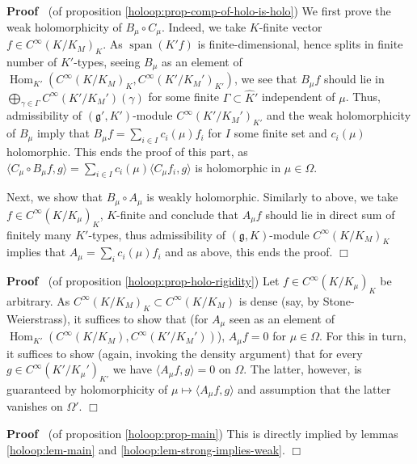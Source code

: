 \documentclass{article}
\newcommand{\tmop}[1]{\ensuremath{\operatorname{#1}}}
\newenvironment{proof}{\noindent\textbf{Proof\ }}{\hspace*{\fill}$\Box$\medskip}
\begin{document}
\begin{proof}
  (of proposition \ref{holoop:prop-comp-of-holo-is-holo}) We first prove the
  weak holomorphicity of $B_{\mu} \circ C_{\mu}$. Indeed, we take $K$-finite
  vector $f \in C^{\infty} (K / K_M)_K$. As $\tmop{span} (K' f)$ is
  finite-dimensional, hence splits in finite number of $K'$-types, seeing
  $B_{\mu}$ as an element of $\tmop{Hom}_{K'} (C^{\infty} (K / K_M)_K,
  C^{\infty} (K' / K_M')_{K'})$, we see that $B_{\mu} f$ should lie in
  $\bigoplus_{\gamma \in \Gamma} C^{\infty} (K' / K_M') (\gamma)$ for some
  finite $\Gamma \subset \hat{K}'$ independent of $\mu$. Thus, admissibility
  of $(\mathfrak{g}', K')$-module $C^{\infty} (K' / K_M')_{K'}$ and the weak
  holomorphicity of $B_{\mu}$ imply that $B_{\mu} f = \sum_{i \in I} c_i (\mu)
  f_i$ for $I$ some finite set and $c_i (\mu)$ holomorphic. This ends the
  proof of this part, as $\langle C_{\mu} \circ B_{\mu} f, g \rangle = \sum_{i
  \in I} c_i (\mu) \langle C_{\mu} f_i, g \rangle$ is holomorphic in $\mu \in
  \Omega$.
  
  Next, we show that $B_{\mu} \circ A_{\mu}$ is weakly holomorphic. Similarly
  to above, we take $f \in C^{\infty} (K / K_{\mu})_K$, $K$-finite and
  conclude that $A_{\mu} f$ should lie in direct sum of finitely many
  $K'$-types, thus admissibility of $(\mathfrak{g}, K)$-module $C^{\infty} (K
  / K_M)_K$ implies that $A_{\mu} = \sum_i c_i (\mu) f_i$ and as above, this
  ends the proof.
\end{proof}

\begin{proof}
  (of proposition \ref{holoop:prop-holo-rigidity}) Let $f \in C^{\infty} (K /
  K_{\mu})_K$ be arbitrary. As $C^{\infty} (K / K_M)_K \subset C^{\infty} (K /
  K_M)$ is dense (say, by Stone-Weierstrass), it suffices to show that (for
  $A_{\mu}$ seen as an element of $\tmop{Hom}_{K'} (C^{\infty} (K / K_M),
  C^{\infty} (K' / K_M'))$), $A_{\mu} f = 0$ for $\mu \in \Omega$. For this in
  turn, it suffices to show (again, invoking the density argument) that for
  every $g \in C^{\infty} (K' / K_{\mu}')_{K'}$ we have $\langle A_{\mu} f, g
  \rangle = 0$ on $\Omega$. The latter, however, is guaranteed by
  holomorphicity of $\mu \mapsto \langle A_{\mu} f, g \rangle$ and assumption
  that the latter vanishes on $\Omega'$.
\end{proof}

\begin{proof}
  (of proposition \ref{holoop:prop-main}) This is directly implied by lemmas
  \ref{holoop:lem-main} and \ref{holoop:lem-strong-implies-weak}.
\end{proof}
\end{document}

